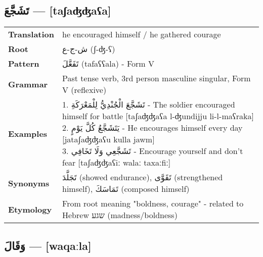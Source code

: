\documentclass[letterpaper,12pt]{article}
\begin{document}
\subsection{\textarabic{تَشَجَّعَ} — [taʃaʤʤaʕa]}

\begin{tabular}{p{3cm}p{10cm}}
\toprule
\textbf{Translation} & he encouraged himself / he gathered courage \\
\textbf{Root} & \textarabic{ش-ج-ع} (ʃ-ʤ-ʕ) \\
\textbf{Pattern} & \textarabic{تَفَعَّلَ} (tafaʕʕala) - Form V \\
\textbf{Grammar} & Past tense verb, 3rd person masculine singular, Form V (reflexive) \\
\textbf{Examples} & \makecell[l]{\parbox{9.5cm}{
1. \textarabic{تَشَجَّعَ الْجُنْدِيُّ لِلْمَعْرَكَةِ} - The soldier encouraged himself for battle [taʃaʤʤaʕa l-ʤundijju li-l-maʕraka]\\
2. \textarabic{يَتَشَجَّعُ كُلَّ يَوْمٍ} - He encourages himself every day [jataʃaʤʤaʕu kulla jawm]\\
3. \textarabic{تَشَجَّعِي وَلَا تَخَافِي} - Encourage yourself and don't fear [taʃaʤʤaʕiː walaː taxaːfiː]
}} \\
\midrule
\textbf{Synonyms} & \textarabic{تَجَلَّدَ} (showed endurance), \textarabic{تَقَوَّى} (strengthened himself), \textarabic{تَمَاسَكَ} (composed himself) \\
\textbf{Etymology} & From root meaning "boldness, courage" - related to Hebrew \texthebrew{שגע} (madness/boldness) \\
\bottomrule
\end{tabular}

\subsection{\textarabic{وَقَالَ} — [waqaːla]}
\end{document}
